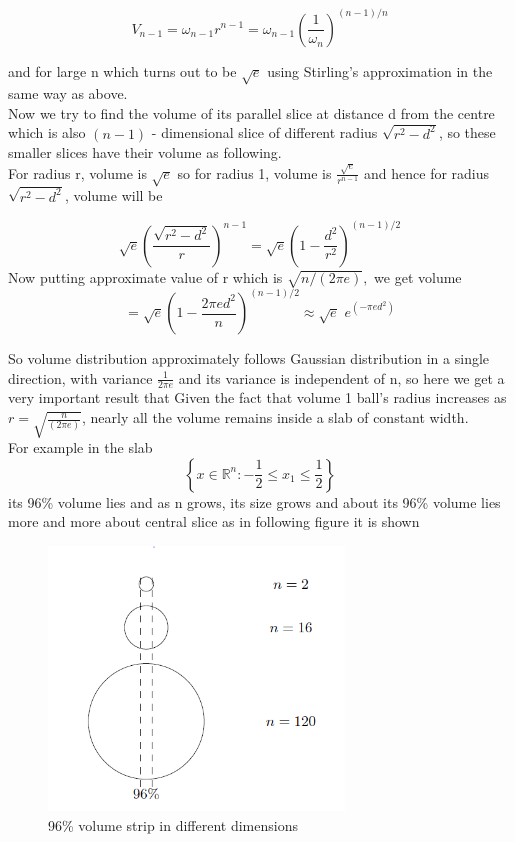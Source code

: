 \documentclass[oneside]{book}
\begin{document}
	$$ V_{n - 1} = \omega_{n-1} r^{n-1}=\omega_{n-1}\left(\frac{1}{\omega_{n}}\right)^{(n-1) / n}$$
	
	and for large n    which turns out to be $\sqrt{e} $ using Stirling's approximation in the same way as above.\\
	Now we try to find the volume of its parallel slice at distance d from the centre which is also $(n - 1)$ -  dimensional slice of different radius $\sqrt{r^2- d^2}$, so these smaller slices have their volume as following. \\
	For radius r, volume is $\sqrt{e}$ so for radius 1, volume is $\frac{\sqrt{e}}{r^{n-1}}$ and hence for radius $\sqrt{r^2- d^2}$, volume will be 
	
	
	\[
	\sqrt{e}\left(\frac{\sqrt{r^{2}-d^{2}}}{r}\right)^{n-1}=\sqrt{e}\left(1-\frac{d^{2}}{r^{2}}\right)^{(n-1) / 2}
	\]
	Now putting approximate value of r which is $\sqrt{n /(2 \pi e)},$ we get volume 
	\[
	= \sqrt{e}\left(1-\frac{2     \pi e d^{2}}{n}\right)^{(n-1) / 2} \approx \sqrt{e} \hspace{4pt} e^{\left(-\pi e d^{2}\right)}
	\]
	
	So volume distribution approximately follows Gaussian distribution  in a single direction, with variance $\frac{1}{2 \pi e}$
	and its variance is independent of n, so here we get a very important result that Given the fact that volume 1 ball's radius increases as $r = \sqrt{\frac{n}{(2 \pi e)}}$, nearly all the volume remains inside a slab of constant width. \\
	For example in the slab $$\left\{x \in \mathbb{R}^{n}:-\frac{1}{2} \leq x_{1} \leq \frac{1}{2}\right\}$$  its 96\%  volume lies and as n grows, its size grows and about its 96\% volume lies more and more about central slice as in following figure it is shown
	\begin{figure}
		\centering
		\includegraphics[width = 0.7\textwidth]{B2.png}
		\caption{96\% volume strip in different dimensions }
		\label{f:1}
	\end{figure}
	
\end{document}

